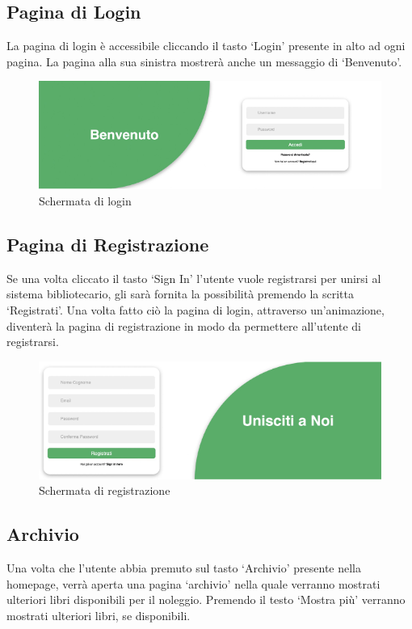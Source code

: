 \documentclass{article}
\begin{document}
\subsection{Pagina di Login}
La pagina di login è accessibile cliccando il tasto ‘Login’ presente in alto ad ogni pagina. La pagina alla sua sinistra mostrerà anche un messaggio di ‘Benvenuto’.

\begin{figure}[H]
    \centering
    \includegraphics[width=130mm]{D1/Images/Login.png}
    \caption{Schermata di login}
\end{figure}

\subsection{Pagina di Registrazione}
Se una volta cliccato il tasto ‘Sign In’ l’utente vuole registrarsi per unirsi al sistema bibliotecario, gli sarà fornita la possibilità premendo la scritta ‘Registrati’. Una volta fatto ciò la pagina di login, attraverso un’animazione, diventerà la pagina di registrazione in modo da permettere all’utente di registrarsi.

\begin{figure}[H]
    \centering
    \includegraphics[width=130mm]{D1/Images/Registrazione.png}
    \caption{Schermata di registrazione}
    \label{fig:enter-label}
\end{figure}

\subsection{Archivio}
Una volta che l’utente abbia premuto sul tasto ‘Archivio’ presente nella homepage, verrà aperta una pagina ‘archivio’ nella quale verranno mostrati ulteriori libri disponibili per il noleggio. Premendo il testo ‘Mostra più’ verranno mostrati ulteriori libri, se disponibili.
\end{document}
